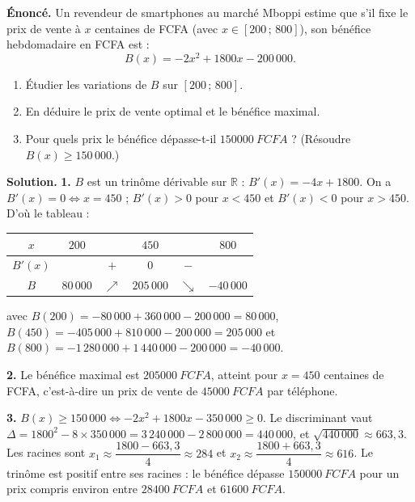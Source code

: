 \documentclass[11pt]{article}
\begin{document}
\begin{exoresolu}
\textbf{Énoncé.} Un revendeur de smartphones au marché Mboppi estime que s'il fixe le prix de vente à $x$ centaines de FCFA (avec $x \in [200\,;\,800]$), son bénéfice hebdomadaire en FCFA est :
\[ B(x) = -2x^2 + 1800x - 200\,000. \]
\begin{enumerate}
\item Étudier les variations de $B$ sur $[200\,;\,800]$.
\item En déduire le prix de vente optimal et le bénéfice maximal.
\item Pour quels prix le bénéfice dépasse-t-il $\SI{150000}{FCFA}$ ? (Résoudre $B(x) \geq 150\,000$.)
\end{enumerate}
\tcblower
\textbf{Solution.}
\textbf{1.} $B$ est un trinôme dérivable sur $\mathbb{R}$ : $B'(x) = -4x + 1800$. On a $B'(x) = 0 \Leftrightarrow x = 450$ ; $B'(x) > 0$ pour $x < 450$ et $B'(x) < 0$ pour $x > 450$. D'où le tableau :
\begin{center}
\begin{tabular}{|c|ccccc|}\hline
$x$ & $200$ & & $450$ & & $800$ \\ \hline
$B'(x)$ & & $+$ & $0$ & $-$ & \\ \hline
$B$ & $80\,000$ & $\nearrow$ & $205\,000$ & $\searrow$ & $-40\,000$ \\ \hline
\end{tabular}
\end{center}
avec $B(200) = -80\,000 + 360\,000 - 200\,000 = 80\,000$, $B(450) = -405\,000 + 810\,000 - 200\,000 = 205\,000$ et $B(800) = -1\,280\,000 + 1\,440\,000 - 200\,000 = -40\,000$.

\textbf{2.} Le bénéfice maximal est $\SI{205000}{FCFA}$, atteint pour $x = 450$ centaines de FCFA, c'est-à-dire un prix de vente de $\SI{45000}{FCFA}$ par téléphone.

\textbf{3.} $B(x) \geq 150\,000 \Leftrightarrow -2x^2 + 1800x - 350\,000 \geq 0$. Le discriminant vaut $\Delta = 1800^2 - 8 \times 350\,000 = 3\,240\,000 - 2\,800\,000 = 440\,000$, et $\sqrt{440\,000} \approx 663{,}3$. Les racines sont $x_1 \approx \dfrac{1800 - 663{,}3}{4} \approx 284$ et $x_2 \approx \dfrac{1800 + 663{,}3}{4} \approx 616$. Le trinôme est positif entre ses racines : le bénéfice dépasse $\SI{150000}{FCFA}$ pour un prix compris environ entre $\SI{28400}{FCFA}$ et $\SI{61600}{FCFA}$.
\end{exoresolu}
\end{document}
